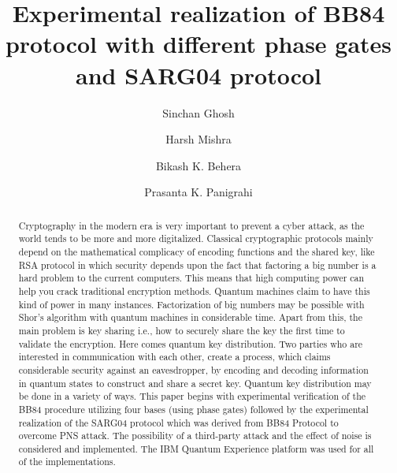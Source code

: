 \documentclass[superscriptaddress,twocolumn,showpacs,prb,floatfix]{revtex4}
\begin{document}
\title{Experimental realization of BB84 protocol with different phase gates and SARG04 protocol}

\author{Sinchan Ghosh}
\author{Harsh Mishra}

\author{Bikash K. Behera}
\author{Prasanta K. Panigrahi}

\begin{abstract}
Cryptography in the modern era is very important to prevent a cyber attack, as the world tends to be more and more digitalized. Classical cryptographic protocols mainly depend on the mathematical complicacy of encoding functions and the shared key, like RSA protocol in which security depends upon the fact that factoring a big number is a hard problem to the current computers. This means that high computing power can help you crack traditional encryption methods. Quantum machines claim to have this kind of power in many instances. Factorization of big numbers may be possible with Shor's algorithm with quantum machines in considerable time. Apart from this, the main problem is key sharing i.e., how to securely share the key the first time to validate the encryption. Here comes quantum key distribution. Two parties who are interested in communication with each other, create a process, which claims considerable security against an eavesdropper, by encoding and decoding information in quantum states to construct and share a secret key. Quantum key distribution may be done in a variety of ways. This paper begins with experimental verification of the BB84 procedure utilizing four bases (using phase gates) followed by the experimental realization of the SARG04 protocol which was derived from BB84 Protocol to overcome PNS attack. The possibility of a third-party attack and the effect of noise is considered and implemented. The IBM Quantum Experience platform was used for all of the implementations.
\end{abstract}
\end{document}
